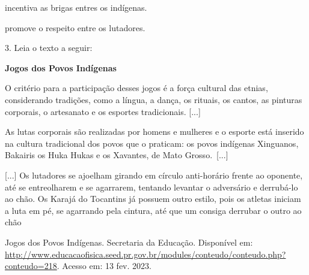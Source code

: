 {{{{{\begin{escolha}
\item incentiva as brigas entres os indígenas.

\item promove o respeito entre os lutadores.
\end{escolha}


3. Leia o texto a seguir:

\textbf{Jogos dos Povos Indígenas}

O critério para a participação desses jogos é a força cultural das
etnias, considerando tradições, como a língua, a dança, os rituais, os
cantos, as pinturas corporais, o artesanato e os esportes tradicionais.
{[}...{]}

As lutas corporais são realizadas por homens e mulheres e o esporte está
inserido na cultura tradicional dos povos que o praticam: os povos
indígenas Xinguanos, Bakairis os Huka Hukas e os Xavantes, de Mato
Grosso.~{[}...{]}

{[}...{]} Os lutadores se ajoelham girando em círculo anti-horário
frente ao oponente, até se entreolharem e se agarrarem, tentando
levantar o adversário e derrubá-lo ao chão. Os Karajá do Tocantins já
possuem outro estilo, pois os atletas iniciam a luta em pé, se agarrando
pela cintura, até que um consiga derrubar o outro ao chão

Jogos dos Povos Indígenas. Secretaria da Educação. Disponível em:
\url{http://www.educacaofisica.seed.pr.gov.br/modules/conteudo/conteudo.php?conteudo=218}.
Acesso em: 13 fev. 2023.

}}}}}
